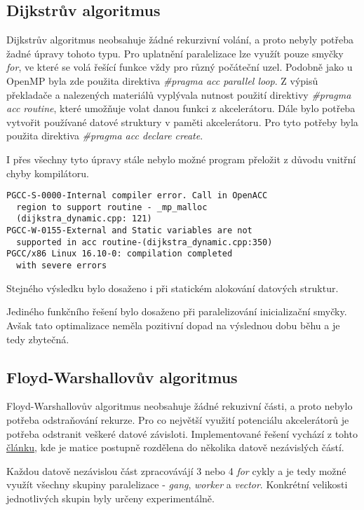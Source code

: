 \documentclass[a4paper,11pt]{article}
\begin{document}
 \subsection{Dijkstrův algoritmus}
 Dijkstrův algoritmus neobsahuje žádné rekurzivní
 volání, a proto nebyly potřeba žadné úpravy tohoto typu. Pro uplatnění paralelizace lze využít pouze
 smyčky \textit{for}, ve které se volá řešící funkce vždy pro různý počáteční uzel. 		
 Podobně jako u OpenMP byla zde použita direktiva \textit{\#pragma acc parallel loop}.
 Z výpisů překladače a nalezených materiálů vyplývala nutnost použití direktivy \textit{\#pragma acc routine},
 které umožňuje volat danou funkci z akcelerátoru. Dále bylo potřeba vytvořit používané datové struktury 
 v paměti akcelerátoru. Pro tyto potřeby byla použita direktiva \textit{\#pragma acc declare create}. 
 
 I přes všechny tyto úpravy stále nebylo možné program přeložit z důvodu vnitřní chyby kompilátoru. 

\begin{lstlisting}
PGCC-S-0000-Internal compiler error. Call in OpenACC
  region to support routine - _mp_malloc
  (dijkstra_dynamic.cpp: 121)
PGCC-W-0155-External and Static variables are not
  supported in acc routine-(dijkstra_dynamic.cpp:350)
PGCC/x86 Linux 16.10-0: compilation completed
  with severe errors
\end{lstlisting}

Stejného výsledku bylo dosaženo i při statickém alokování datových struktur.  

Jediného funkčního řešení bylo dosaženo při paralelizování inicializační smyčky. Avšak tato optimalizace 
neměla pozitivní dopad na výslednou dobu běhu a je tedy zbytečná.
 
\subsection{Floyd-Warshallovův algoritmus}
 Floyd-Warshallovův algoritmus neobsahuje žádné rekuzivní části, a proto nebylo potřeba
 odstraňování rekurze. Pro co největší využití potenciálu akcelerátorů je potřeba odstranit veškeré
 datové závisloti. Implementované řešení vychází z tohto 
  \href{https://gcc.gnu.org/projects/tree-ssa/vectorization.html#vectorizab}{článku},
  kde je matice postupně rozdělena do několika datově nezávislých částí.

  Každou datově nezávislou část zpracovávájí 3 nebo 4 \textit{for} cykly a je tedy možné využít všechny
  skupiny paralelizace - \textit{gang}, \textit{worker} a \textit{vector}. Konkrétní velikosti jednotlivých
  skupin byly určeny experimentálně. 
  
\end{document}
